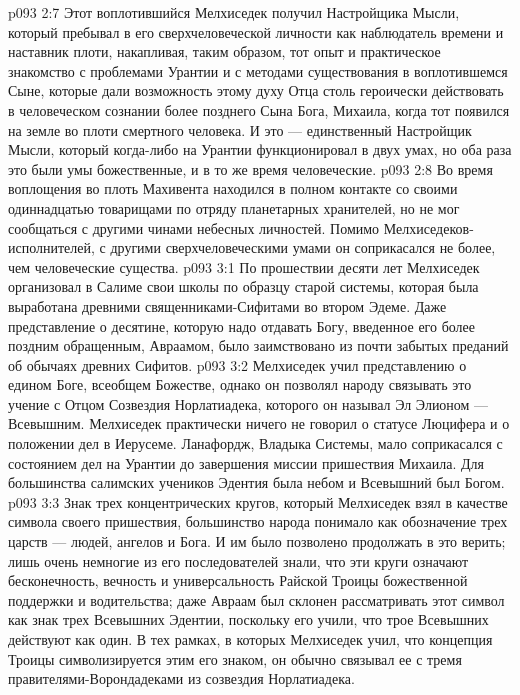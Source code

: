 \vs p093 2:7 \pc Этот воплотившийся Мелхиседек получил Настройщика Мысли, который пребывал в его сверхчеловеческой личности как наблюдатель времени и наставник плоти, накапливая, таким образом, тот опыт и практическое знакомство с проблемами Урантии и с методами существования в воплотившемся Сыне, которые дали возможность этому духу Отца столь героически действовать в человеческом сознании более позднего Сына Бога, Михаила, когда тот появился на земле во плоти смертного человека. И это --- единственный Настройщик Мысли, который когда\hyp{}либо на Урантии функционировал в двух умах, но оба раза это были умы божественные, и в то же время человеческие.
\vs p093 2:8 Во время воплощения во плоть Махивента находился в полном контакте со своими одиннадцатью товарищами по отряду планетарных хранителей, но не мог сообщаться с другими чинами небесных личностей. Помимо Мелхиседеков\hyp{}исполнителей, с другими сверхчеловеческими умами он соприкасался не более, чем человеческие существа.
\vs p093 3:1 По прошествии десяти лет Мелхиседек организовал в Салиме свои школы по образцу старой системы, которая была выработана древними священниками\hyp{}Сифитами во втором Эдеме. Даже представление о десятине, которую надо отдавать Богу, введенное его более поздним обращенным, Авраамом, было заимствовано из почти забытых преданий об обычаях древних Сифитов.
\vs p093 3:2 Мелхиседек учил представлению о едином Боге, всеобщем Божестве, однако он позволял народу связывать это учение с Отцом Созвездия Норлатиадека, которого он называл Эл Элионом --- Всевышним. Мелхиседек практически ничего не говорил о статусе Люцифера и о положении дел в Иерусеме. Ланафордж, Владыка Системы, мало соприкасался с состоянием дел на Урантии до завершения миссии пришествия Михаила. Для большинства салимских учеников Эдентия была небом и Всевышний был Богом.
\vs p093 3:3 Знак трех концентрических кругов, который Мелхиседек взял в качестве символа своего пришествия, большинство народа понимало как обозначение трех царств --- людей, ангелов и Бога. И им было позволено продолжать в это верить; лишь очень немногие из его последователей знали, что эти круги означают бесконечность, вечность и универсальность Райской Троицы божественной поддержки и водительства; даже Авраам был склонен рассматривать этот символ как знак трех Всевышних Эдентии, поскольку его учили, что трое Всевышних действуют как один. В тех рамках, в которых Мелхиседек учил, что концепция Троицы символизируется этим его знаком, он обычно связывал ее с тремя правителями\hyp{}Ворондадеками из созвездия Норлатиадека.
